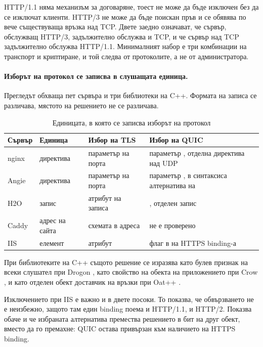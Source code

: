 HTTP/1.1 няма механизъм за договаряне, тоест не може да бъде изключен без да се изключат
клиенти. HTTP/3 не може да бъде поискан пръв и се обявява по вече съществуваща връзка над
TCP. Двете заедно означават, че сървър, обслужващ HTTP/3, задължително обслужва и TCP, и че
сървър над TCP задължително обслужва HTTP/1.1. Минималният набор е три комбинации на
транспорт и криптиране, и той следва от протоколите, а не от администратора.

\paragraph{Изборът на протокол се записва в слушащата единица.} Прегледът обхваща пет сървъра
и три библиотеки на C++. Формата на записа се различава, мястото на решението не се различава.

\begin{table}[H]
\centering
\caption{Единицата, в която се записва изборът на протокол}
\label{tab:av-listener-models}
\begin{tabular}{@{}L{1.8cm}L{2.9cm}L{4.6cm}L{4.4cm}@{}}
\toprule
\textbf{Сървър} & \textbf{Единица} & \textbf{Избор на TLS} & \textbf{Избор на QUIC} \\
\midrule
nginx & директива  & параметър  на порта & параметър ,
отделна директива над UDP \\
Angie & директива  & параметър  на порта & параметър , в
синтаксиса алтернатива на  \\
H2O & запис  & атрибут  на записа & , отделен запис \\
Caddy & адрес на сайта & схемата в адреса & не е проверено \\
IIS & елемент  & атрибут  & флаг в  на HTTPS
binding-а \\
\bottomrule
\end{tabular}
\end{table}

При библиотеките на C++ същото решение се изразява като булев признак на всеки слушател при
Drogon \cite{drogonconfig}, като свойство на обекта на приложението при Crow \cite{crowssl},
и като отделен обект доставчик на връзки при Oat++ \cite{oatpp}.

Изключението при IIS е важно и в двете посоки. То показва, че обвързването не е неизбежно,
защото там един binding поема и HTTP/1.1, и HTTP/2. Показва обаче и че избраната алтернатива
премества решението в бит на друг обект, вместо да го премахне: QUIC остава привързан към
наличието на HTTPS binding.

